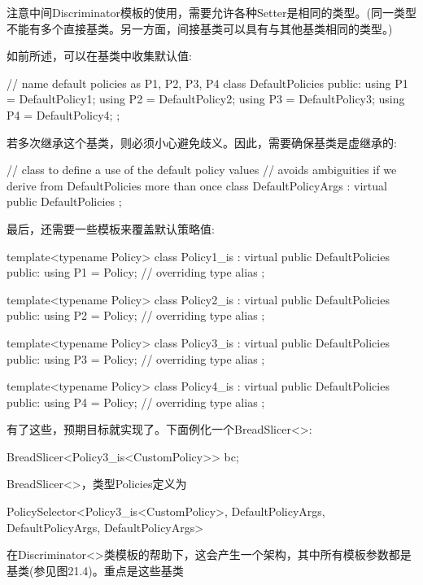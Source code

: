 注意中间Discriminator模板的使用，需要允许各种Setter是相同的类型。(同一类型不能有多个直接基类。另一方面，间接基类可以具有与其他基类相同的类型。)

如前所述，可以在基类中收集默认值:

\begin{cpp}
// name default policies as P1, P2, P3, P4
class DefaultPolicies {
	public:
	using P1 = DefaultPolicy1;
	using P2 = DefaultPolicy2;
	using P3 = DefaultPolicy3;
	using P4 = DefaultPolicy4;
};
\end{cpp}

若多次继承这个基类，则必须小心避免歧义。因此，需要确保基类是虚继承的:

\begin{cpp}
// class to define a use of the default policy values
// avoids ambiguities if we derive from DefaultPolicies more than once
class DefaultPolicyArgs : virtual public DefaultPolicies {
};
\end{cpp}

最后，还需要一些模板来覆盖默认策略值:

\begin{cpp}
template<typename Policy>
class Policy1_is : virtual public DefaultPolicies {
	public:
	using P1 = Policy; // overriding type alias
};

template<typename Policy>
class Policy2_is : virtual public DefaultPolicies {
	public:
	using P2 = Policy; // overriding type alias
};

template<typename Policy>
class Policy3_is : virtual public DefaultPolicies {
	public:
	using P3 = Policy; // overriding type alias
};

template<typename Policy>
class Policy4_is : virtual public DefaultPolicies {
	public:
	using P4 = Policy; // overriding type alias
};
\end{cpp}

有了这些，预期目标就实现了。下面例化一个BreadSlicer<>:

\begin{cpp}
BreadSlicer<Policy3_is<CustomPolicy>> bc;
\end{cpp}

BreadSlicer<>，类型Policies定义为

\begin{cpp}
PolicySelector<Policy3_is<CustomPolicy>,
				DefaultPolicyArgs,
				DefaultPolicyArgs,
				DefaultPolicyArgs>
\end{cpp}

在Discriminator<>类模板的帮助下，这会产生一个架构，其中所有模板参数都是基类(参见图21.4)。重点是这些基类

